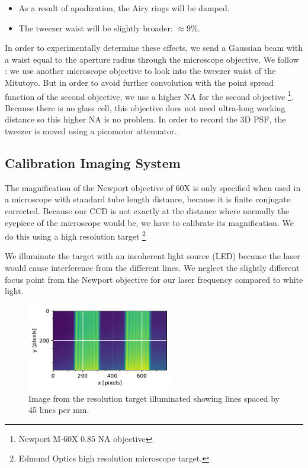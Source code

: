 \begin{itemize}
    \item As a result of apodization, the Airy rings will be damped. 
    \item The tweezer waist will be slightly broader: $\approx 9\%$.
\end{itemize}

In order to experimentally determine these effects, we send a Gaussian beam with a waist equal to the aperture radius through the microscope objective. 
We follow \cite{Baumgaertner2017}: we use another microscope objective to look into the tweezer waist of the Mitutoyo.
But in order to avoid further convolution with the point spread function of the second objective, we use a higher NA for the second objective \footnote{Newport M-60X 0.85 NA objective}. 
Because there is no glass cell, this objective does not need ultra-long working distance so this higher NA is no problem. 
In order to record the 3D PSF, the tweezer is moved using a picomotor attenuator. 

\subsection{Calibration Imaging System}

The magnification of the Newport objective of 60X is only specified when used in a microscope with standard tube length distance, because it is finite conjugate corrected. Because our CCD is not exactly at the distance where normally the eyepiece of the microscope would be, we have to calibrate its magnification. We do this using a high resolution target \footnote{Edmund Optics high resolution microscope target.} 

We illuminate the target with an incoherent light source (LED) because the laser would cause interference from the different lines. We neglect the slightly different focus point from the Newport objective for our laser frequency compared to white light. 

\begin{figure}
    \centering
    \includegraphics[width = 2.5in]{figures/linespacing.pdf}
    \caption{Image from the resolution target illuminated showing lines spaced by 45 lines per mm.}
    \label{fig:resolutionTarget}
\end{figure}

